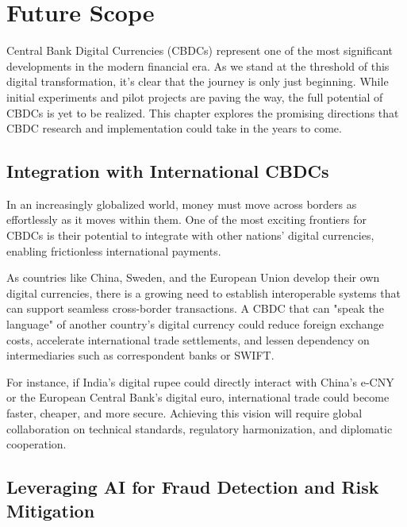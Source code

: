 %
\chapter{Future Scope}
\label{chp7}

Central Bank Digital Currencies (CBDCs) represent one of the most significant developments in the modern financial era. As we stand at the threshold of this digital transformation, it’s clear that the journey is only just beginning. While initial experiments and pilot projects are paving the way, the full potential of CBDCs is yet to be realized. This chapter explores the promising directions that CBDC research and implementation could take in the years to come.

\section{Integration with International CBDCs}

In an increasingly globalized world, money must move across borders as effortlessly as it moves within them. One of the most exciting frontiers for CBDCs is their potential to integrate with other nations’ digital currencies, enabling frictionless international payments.

As countries like China, Sweden, and the European Union develop their own digital currencies, there is a growing need to establish interoperable systems that can support seamless cross-border transactions. A CBDC that can "speak the language" of another country's digital currency could reduce foreign exchange costs, accelerate international trade settlements, and lessen dependency on intermediaries such as correspondent banks or SWIFT.

For instance, if India's digital rupee could directly interact with China's e-CNY or the European Central Bank's digital euro, international trade could become faster, cheaper, and more secure. Achieving this vision will require global collaboration on technical standards, regulatory harmonization, and diplomatic cooperation.

\section{Leveraging AI for Fraud Detection and Risk Mitigation}

